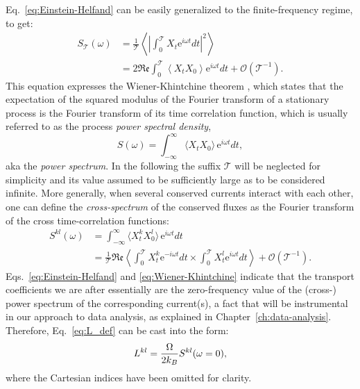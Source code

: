 Eq.~\eqref{eq:Einstein-Helfand} can be easily generalized to the finite-frequency regime, to get:
\begin{equation}
  \begin{aligned}
    S_\mathcal{T}(\omega) &= \frac{1}{\mathcal{T}} \left \langle \left | \int_0^\mathcal{T} X_t \mathrm{e}^{i\omega t}dt \right |^2 \right \rangle \\
    &= 2\mathfrak{Re} \int_0^\mathcal{T} \left \langle X_t X_0 \right \rangle \mathrm{e}^{i\omega t}dt + \mathcal{O}(\mathcal{T}^{-1}).
  \end{aligned}
  \label{eq:Wiener-Khintchine}
\end{equation}
This equation expresses the Wiener-Khintchine theorem \cite{Wiener1930,Khintchine1934}, which states that the expectation of the squared modulus of the Fourier transform of a stationary process is the Fourier transform of its time correlation function, which is usually referred to as the process \emph{power spectral density},
\begin{equation}
  S(\omega) = \int_{-\infty}^\infty \langle X_t X_0 \rangle \,\mathrm{e}^{i\omega t} dt, \label{eq:S(omega)}
\end{equation}
aka the \emph{power spectrum}. In the following the suffix $\mathcal{T}$ will be neglected for simplicity and its value assumed to be sufficiently large as to be considered infinite. More generally, when several conserved currents interact with each other, one can define the \emph{cross-spectrum} of the conserved fluxes as the Fourier transform of the cross time-correlation functions:
\begin{equation}
  \begin{aligned}
    S^{kl}(\omega) &= \int_{-\infty}^\infty \langle X^k_t X^l_0 \rangle \,\mathrm{e}^{i\omega t} dt \\
    &= \frac{1}{\mathcal{T}} \mathfrak{Re} \left\langle \int_0^\mathcal{T} X^k_t \mathrm{e}^{-i\omega t}dt \times \int_0^\mathcal{T} X^l_t \mathrm{e}^{i\omega t}dt \right\rangle + \mathcal{O}(\mathcal{T}^{-1}).
  \end{aligned} \label{eq:Sij(omega)}
\end{equation}
Eqs.~\eqref{eq:Einstein-Helfand} and \eqref{eq:Wiener-Khintchine} indicate that the transport coefficients we are after essentially are the zero-frequency value of the (cross-) power spectrum of the corresponding current(s), a fact that will be instrumental in our approach to data analysis, as explained in Chapter~\ref{ch:data-analysis}. Therefore, Eq.~\eqref{eq:L_def} can be cast into the form:
\begin{equation}
    L^{kl} =\frac{\rOmega}{2 k_B} S^{kl}(\omega=0), \label{eq:GK-S0}
\end{equation}
where the Cartesian indices have been omitted for clarity.


